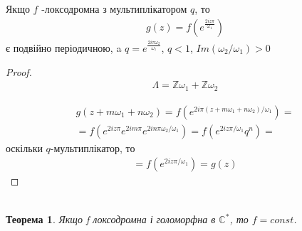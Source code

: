 \documentclass[12pt,a4paper]{article}
\begin{document}
\begin{twerd}
 Якщо $f$  -локсодромна з мультиплікатором $q$, то  
\[\begin{array}{l}
g(z)=f(e^{\frac{2iz\pi}{\omega_{1}}})
\end{array}\] 
є подвійно періодичною, a $q=e^{\frac{2i\pi \omega_{2}}{ \omega_{1}}}$, $q<1$, $Im(\omega_{2}/\omega_{1})>0$
\end{twerd}
\begin{proof}
\[\begin{array}{l}
\Lambda = \mathbb{Z}\omega_{1} + \mathbb{Z}\omega_{2} 
\end{array}\]

\[\begin{array}{l}
g(z+m\omega_{1}+ n\omega_{2})= f(e^{2i\pi(z+m\omega_{1}+ n\omega_{2})/\omega_{1}})=\\
=f( e^{2iz\pi}e^{2im\pi}e^{2in\pi\omega_{2} / \omega_{1}})=
f(e^{2iz\pi/\omega_{1}}q^{n})=
\end{array}\]
 оскільки $q$-мультиплікатор, то
 \[\begin{array}{l}
 =f(e^{2iz\pi/\omega_{1}})=g(z)
 \end{array}\]
\end{proof}
\[\begin{array}{l}
\end{array} \]

\newtheorem{thm}{Теорема}
\begin{thm}
Якщо f локсодромна і голоморфна в $\mathbb{C}^{*}$, то $f=const$.
\end{thm}
\end{document}
